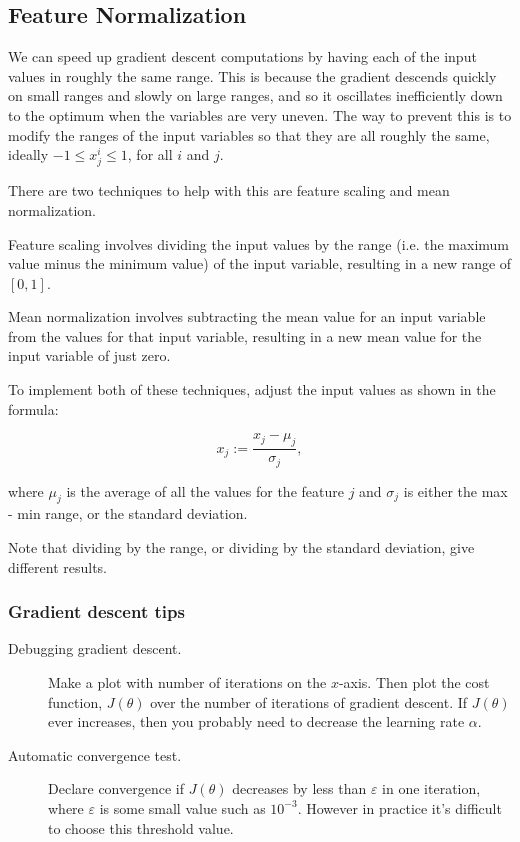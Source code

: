 \documentclass[a4paper,11pt]{report}
\begin{document}
\subsection*{Feature Normalization}

We can speed up gradient descent computations by having each of the input values in roughly the same range. This is because the gradient descends quickly on small ranges and slowly on large ranges, and so it oscillates inefficiently down to the optimum when the variables are very uneven.
The way to prevent this is to modify the ranges of the input variables so that they are all roughly the same, ideally $−1\leq x^i_j \leq 1$, for all $i$ and $j$.

There are two techniques to help with this are feature scaling and mean normalization.

Feature scaling involves dividing the input values by the range (i.e. the maximum value minus the minimum value) of the input variable, resulting in a new range of $[0, 1]$.

Mean normalization involves subtracting the mean value for an input variable from the values for that input variable, resulting in a new mean value for the input variable of just zero.

To implement both of these techniques, adjust the input values as shown in the formula:

$$x_j := \dfrac{x_j - \mu_j}{\sigma_j},$$

where $\mu_j$ is the average of all the values for the feature $j$ and $\sigma_j$ is either the max - min range, or the standard deviation.

Note that dividing by the range, or dividing by the standard deviation, give different results.

\subsubsection*{Gradient descent tips}

\begin{description}
  \item[Debugging gradient descent.]  Make a plot with number of iterations on the $x$-axis. Then plot the cost function, $J(\theta)$ over the number of iterations of gradient descent. If $J(\theta)$ ever increases, then you probably need to decrease the learning rate $\alpha$.
  \item[Automatic convergence test.] Declare convergence if $J(\theta)$ decreases by less than $\varepsilon$ in one iteration, where $\varepsilon$ is some small value such as $10^{-3}$. However in practice it's difficult to choose this threshold value.
\end{description}
\end{document}
